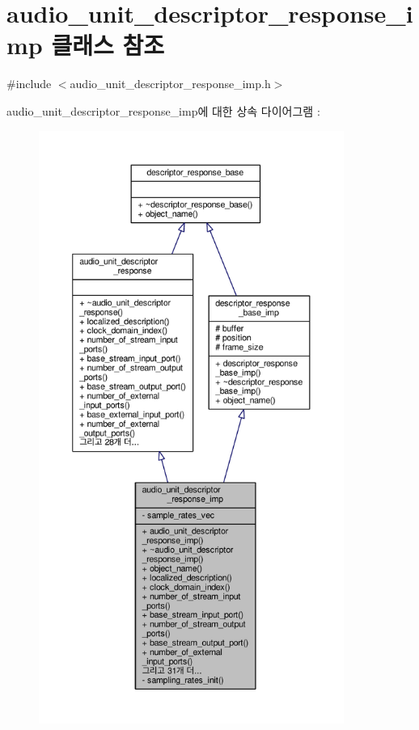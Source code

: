 \hypertarget{classavdecc__lib_1_1audio__unit__descriptor__response__imp}{}\section{audio\+\_\+unit\+\_\+descriptor\+\_\+response\+\_\+imp 클래스 참조}
\label{classavdecc__lib_1_1audio__unit__descriptor__response__imp}


{\ttfamily \#include $<$audio\+\_\+unit\+\_\+descriptor\+\_\+response\+\_\+imp.\+h$>$}



audio\+\_\+unit\+\_\+descriptor\+\_\+response\+\_\+imp에 대한 상속 다이어그램 \+: 
\nopagebreak
\begin{figure}[H]
\begin{center}
\leavevmode
\includegraphics[height=550pt]{classavdecc__lib_1_1audio__unit__descriptor__response__imp__inherit__graph}
\end{center}
\end{figure}



